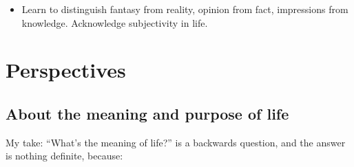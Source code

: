 \documentclass[
]{book}
\providecommand{\tightlist}{%
  \setlength{\itemsep}{0pt}\setlength{\parskip}{0pt}}
\begin{document}
\begin{itemize}
  \begin{itemize}
  \tightlist
  \item
    Learn to distinguish fantasy from reality, opinion from fact, impressions from knowledge. Acknowledge subjectivity in life.
  \end{itemize}
\end{itemize}

\hypertarget{perspectives}{%
\section{Perspectives}\label{perspectives}}

\hypertarget{about-the-meaning-and-purpose-of-life}{%
\subsection{About the meaning and purpose of life}\label{about-the-meaning-and-purpose-of-life}}

My take: ``What's the meaning of life?'' is a backwards question, and the answer is nothing definite, because:
\end{document}
